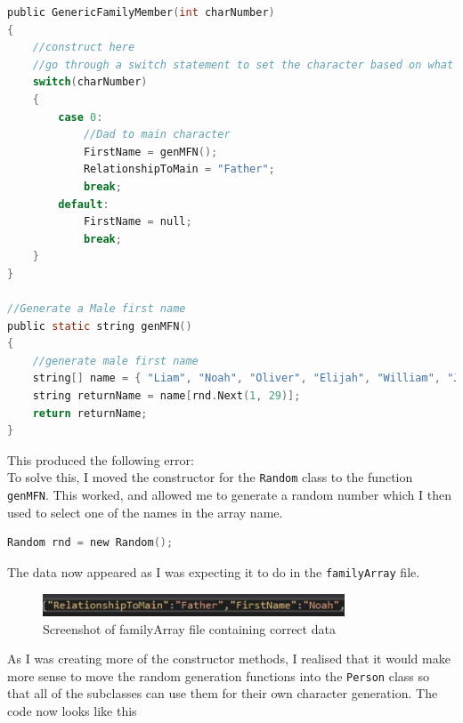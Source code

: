 \begin{lstlisting}[language=c, style=csharp, caption=Initial test of generating a Random Character]
public GenericFamilyMember(int charNumber)
{
    //construct here
    //go through a switch statement to set the character based on what their relationship to the main is.
    switch(charNumber)
    {
        case 0:
            //Dad to main character
            FirstName = genMFN();
            RelationshipToMain = "Father";
            break;
        default:
            FirstName = null;
            break;
    }
}

//Generate a Male first name
public static string genMFN()
{
    //generate male first name
    string[] name = { "Liam", "Noah", "Oliver", "Elijah", "William", "James", "Benjamin", "Ben", "Lucas", "Henry", "Alex", "Ethan", "Daniel", "Sebstian", "Jack", "Matt", "John", "Joe", "David", "Josh", "Julien", "Leo", "Isaac", "Thomas", "Max", "Andy", "Phill", "Harvey", "Ryan" };
    string returnName = name[rnd.Next(1, 29)];
    return returnName;
}
\end{lstlisting}
This produced the following error: \\
To solve this, I moved the constructor for the \verb|Random| class to the function \verb|genMFN|. This worked, and allowed me to generate a random number which I then used to select one of the names in the array name.
\begin{lstlisting}[language=c, style=csharp, caption=Creating a Random object of class Random for later use]
Random rnd = new Random();
\end{lstlisting}
The data now appeared as I was expecting it to do in the \verb|familyArray| file.
\begin{figure}[H]
    \centering
    \includegraphics[width=0.8\textwidth]{images/implementation/familyArrayData.png}
    \caption{Screenshot of familyArray file containing correct data}
    \label{fig:implementation-familyArrayData}
\end{figure}
\noindent As I was creating more of the constructor methods, I realised that it would make more sense to move the random generation functions into the \verb|Person| class so that all of the subclasses can use them for their own character generation. The code now looks like this
